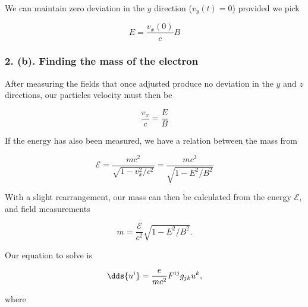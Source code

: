 {We can maintain zero deviation in the $y$ direction ($v_y(t) = 0$) provided we pick

\begin{equation}\label{eqn:relElectroDynProblemSet2:410}
E = \frac{v_x(0)}{c} B
\end{equation}

\subsubsection{2. (b). Finding the mass of the electron}

After measuring the fields that once adjusted produce no deviation in the $y$ and $z$ directions, our particles velocity must then be

\begin{equation}\label{eqn:relElectroDynProblemSet2:430}
\frac{v_x}{c} = \frac{E}{B}
\end{equation}

If the energy has also been measured, we have a relation between the mass from

\begin{equation}\label{eqn:relElectroDynProblemSet2:450}
\mathcal{E} = \frac{m c^2}{\sqrt{1 - v_x^2/c^2}} = \frac{ m c^2 }{ \sqrt{ 1 - E^2/B^2 }}
\end{equation}

With a slight rearrangement, our mass can then be calculated from the energy $\mathcal{E}$, and field measurements

\begin{equation}\label{eqn:relElectroDynProblemSet2:470}
m = \frac{ \mathcal{E} }{c^2} \sqrt{ 1 - E^2/B^2 }.
\end{equation}



Our equation to solve is

\begin{equation}\label{eqn:relElectroDynProblemSet2:490}
\dds{u^i} = \frac{e}{m c^2} F^{ij} g_{jk} u^k,
\end{equation}

where

}
